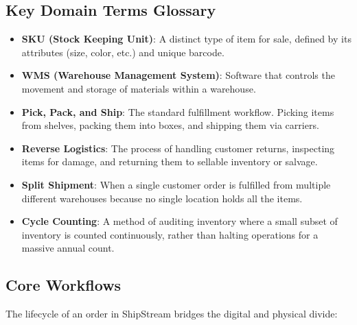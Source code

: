 \subsection{Key Domain Terms
Glossary}\label{key-domain-terms-glossary-2}

\begin{itemize}
\tightlist
\item
  \textbf{SKU (Stock Keeping Unit)}: A distinct type of item for sale,
  defined by its attributes (size, color, etc.) and unique barcode.
\item
  \textbf{WMS (Warehouse Management System)}: Software that controls the
  movement and storage of materials within a warehouse.
\item
  \textbf{Pick, Pack, and Ship}: The standard fulfillment workflow.
  Picking items from shelves, packing them into boxes, and shipping them
  via carriers.
\item
  \textbf{Reverse Logistics}: The process of handling customer returns,
  inspecting items for damage, and returning them to sellable inventory
  or salvage.
\item
  \textbf{Split Shipment}: When a single customer order is fulfilled
  from multiple different warehouses because no single location holds
  all the items.
\item
  \textbf{Cycle Counting}: A method of auditing inventory where a small
  subset of inventory is counted continuously, rather than halting
  operations for a massive annual count.
\end{itemize}

\subsection{Core Workflows}\label{core-workflows-2}

The lifecycle of an order in ShipStream bridges the digital and physical
divide:

